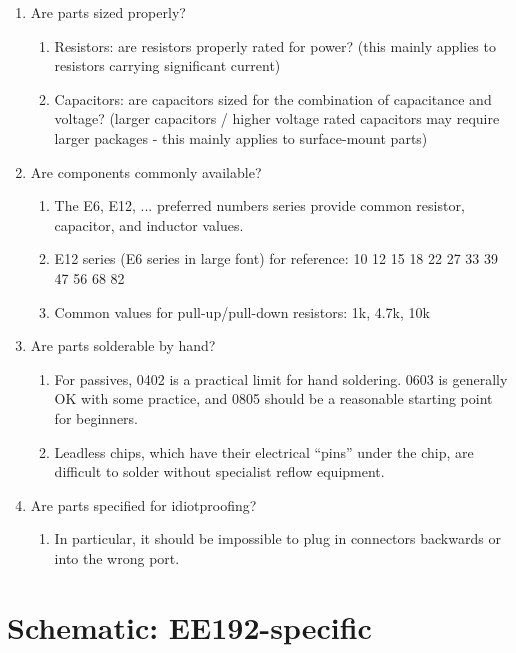 \documentclass{article}
\begin{document}
\begin{enumerate}
  \item Are parts sized properly?
  \begin{enumerate}
    \item Resistors: are resistors properly rated for power? (this mainly applies to resistors carrying significant current)
    \item Capacitors: are capacitors sized for the combination of capacitance and voltage? (larger capacitors / higher voltage rated capacitors may require larger packages - this mainly applies to surface-mount parts)
  \end{enumerate}
  \item Are components commonly available?
  \begin{enumerate}
    \item The E6, E12, ... preferred numbers series provide common resistor, capacitor, and inductor values.
    \item E12 series (E6 series in large font) for reference: 10 {\footnotesize 12} 15 {\footnotesize 18} 22 {\footnotesize 27} 33 {\footnotesize 39} 47 {\footnotesize 56} 68 {\footnotesize 82}
    \item Common values for pull-up/pull-down resistors: 1k, 4.7k, 10k
  \end{enumerate}
  \item Are parts solderable by hand?
  \begin{enumerate}
    \item For passives, 0402 is a practical limit for hand soldering. 0603 is generally OK with some practice, and 0805 should be a reasonable starting point for beginners.
    \item Leadless chips, which have their electrical ``pins'' under the chip, are difficult to solder without specialist reflow equipment.
  \end{enumerate}
  \item Are parts specified for idiotproofing?
  \begin{enumerate}
    \item In particular, it should be impossible to plug in connectors backwards or into the wrong port.
  \end{enumerate}
\end{enumerate}

\section{Schematic: EE192-specific}
\end{document}
